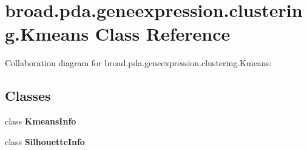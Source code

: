 \hypertarget{classbroad_1_1pda_1_1geneexpression_1_1clustering_1_1_kmeans}{\section{broad.\+pda.\+geneexpression.\+clustering.\+Kmeans Class Reference}
\label{classbroad_1_1pda_1_1geneexpression_1_1clustering_1_1_kmeans}
}


Collaboration diagram for broad.\+pda.\+geneexpression.\+clustering.\+Kmeans\+:
\subsection*{Classes}
\begin{DoxyCompactItemize}
\item 
class {\bfseries Kmeans\+Info}
\item 
class {\bfseries Silhouette\+Info}
\end{DoxyCompactItemize}
